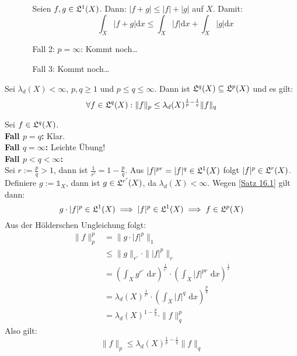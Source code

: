 \documentclass[a4paper,twoside,DIV15,BCOR12mm,chapterprefix=true,headings=onelinechapter]{scrbook}
\begin{document}
\begin{beweis}
\begin{enumerate}
\begin{itemize}
Seien \(f,g\in\mathfrak{L}^{1}(X)\). Dann: \(\lvert f+g\rvert\leq\lvert f\rvert+\lvert g\rvert\) auf \(X\). Damit:
\[
\int_{X}{\lvert f+g\rvert\mathrm{d}x}\leq\int_{X}{\lvert f\rvert\mathrm{d}x}+\int_{X}{\lvert g\rvert\mathrm{d}x}
\]
\item[Fall 2:] \(p=\infty\): Kommt noch\ldots
\item[Fall 3:] Kommt noch\ldots
\end{itemize}
\end{enumerate}
\end{beweis}

\begin{satz}
\label{Satz 16.2}
Sei $\lambda_d(X)<\infty$, $p,q\ge 1$ und $p\leq q \leq \infty$. Dann ist $\mathfrak{L}^q(X)\subseteq\mathfrak{L}^p(X)$ und es gilt:
\[\forall f\in\mathfrak{L}^q(X): \|f\|_p\le\lambda_d(X)^{\frac1p-\frac1q}\|f\|_q\]
\end{satz}

\begin{beweis}
Sei $f\in\mathfrak{L}^q(X)$.\\
\textbf{Fall $p=q$:} Klar.\\
\textbf{Fall $q=\infty$:} Leichte Übung!\\
\textbf{Fall $p<q<\infty$:}\\
Sei $r:=\frac pq>1$, dann ist $\frac 1{r'}=1-\frac pq$. Aus $|f|^{pr}=|f|^q\in\mathfrak{L}^1(X)$ folgt $|f|^p\in\mathfrak{L}^r(X)$. Definiere $g:=\mathds{1}_X$, dann ist $g\in\mathfrak{L}^{r'}(X)$, da $\lambda_d(X)<\infty$. Wegen \ref{Satz 16.1} gilt dann:
\[g\cdot|f|^p\in\mathfrak{L}^1(X)\implies |f|^p\in\mathfrak{L}^1(X)\implies f\in\mathfrak{L}^p(X)\]
Aus der Hölderschen Ungleichung folgt:
\begin{align*}
\|f\|^p_p&=\|g\cdot |f|^p\|_1\\
&\le \|g\|_{r'}\cdot\||f|^p\|_r\\
&= (\int_X g^{r'}\text{ d}x)^{\frac 1{r'}}\cdot(\int_X |f|^{pr}\text{ d}x)^{\frac 1r}\\
&= \lambda_d(X)^{\frac1{r'}}\cdot(\int_X |f|^{q}\text{ d}x)^{\frac pq}\\
&= \lambda_d(X)^{1-\frac pq}\cdot\|f\|^p_q
\end{align*}
Also gilt:
\[\|f\|_p\le\lambda_d(X)^{\frac1p-\frac1q}\|f\|_q\]
\end{beweis}
\end{document}
